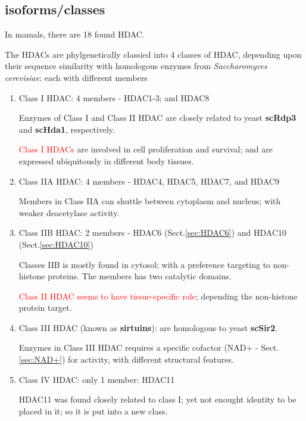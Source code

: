 \subsection{isoforms/classes}
\label{sec:HDAC-classes}

In mamals, there are 18 found HDAC.

The HDACs are phylgenetically classied into 4 classes of HDAC, depending upon
their sequence similarity with homologous enzymes from {\it Saccharomyces
cerevisiae}: each with different members
\begin{enumerate}
  \item Class I HDAC: 4 members - HDAC1-3; and HDAC8
  
  Enzymes of Class I and Class II HDAC are closely related to yeast {\bf scRdp3}
  and {\bf scHda1}, respectively. 
  
  \textcolor{red}{Class I HDACs} are involved in cell proliferation
  and survival; and are expressed ubiquitously in different body tissues. 
    
  \item Class IIA HDAC: 4 members - HDAC4, HDAC5, HDAC7, and HDAC9
  
  Members in Class IIA can shuttle between cytoplasm and nucleus; with weaker
  deacetylase activity.
  
  \item Class IIB HDAC: 2 members - HDAC6 (Sect.\ref{sec:HDAC6}) and HDAC10
  (Sect.\ref{sec:HDAC10})
  
  Classes IIB is mostly found in cytosol; with a preference targeting to
  non-histone proteins.
  The members has two catalytic domains.
  
  
  \textcolor{red}{Class II HDAC seems to have tissue-specific role}; depending
  the non-histone protein target.
   
  \item Class III HDAC (known as {\bf sirtuins}): are homologous to yeast {\bf
  scSir2}. 
  
  Enzymes in Class III HDAC requires a specific cofactor (NAD+ -
  Sect.\ref{sec:NAD+}) for activity, with different structural features.
  
  \item Class IV HDAC: only 1 member: HDAC11

HDAC11 was found closely related to class I; yet not enought identity to be
placed in it; so it is put into a new class.

\end{enumerate}

